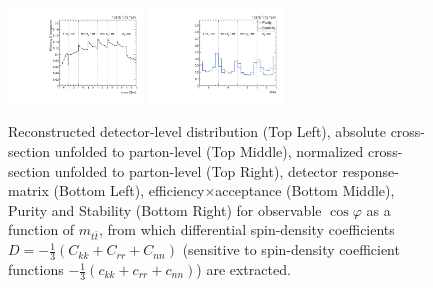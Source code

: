 \begin{figure}[htb]
\begin{center}
 \includegraphics[width=0.32\textwidth]{fig_fullRun2UL/unfolding/combined/TotEff_ll_cHel_mttbar.pdf}
 \includegraphics[width=0.32\textwidth]{fig_fullRun2UL/unfolding/combined/PurStab_ll_cHel_mttbar.pdf} \\
\caption{Reconstructed detector-level distribution (Top Left), absolute cross-section unfolded to parton-level (Top Middle), normalized cross-section unfolded to parton-level (Top Right), detector response-matrix (Bottom Left), efficiency$\times$acceptance (Bottom Middle), Purity and Stability (Bottom Right) for  observable $\cos\varphi$ as a function of $m_{t\bar{t}}$, from which differential spin-density coefficients $D = -\frac{1}{3}(C_{kk} + C_{rr} + C_{nn})$ (sensitive to spin-density coefficient functions $-\frac{1}{3}(c_{kk} + c_{rr} + c_{nn})$) are extracted.}
\label{fig:ll_cHel_mttbar}
\end{center}
\end{figure}
\clearpage

